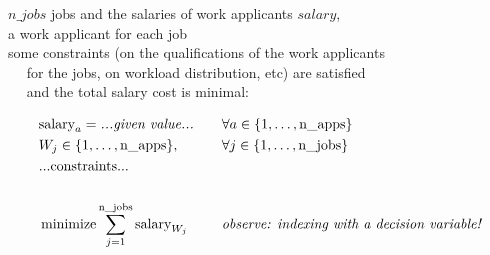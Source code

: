 \documentclass{cons-beamer}
\begin{document}
\begin{frame}
  \begin{example}
     $n\_jobs$ jobs and the salaries of work applicants $salary$, \\ 
     a work applicant for each job \\ 
     some constraints (on the qualifications of the work applicants \\
    ~~ for the jobs, on workload distribution, etc) are satisfied \\ 
    ~~ and the total salary cost is minimal: 

    \small
    \vspace{-1em}
    \begin{align}
      &\text{salary}_a = \textit{...given value...} \quad && \forall a \in \{1, \ldots, \text{n\_apps}\} \\
      &W_j \in \{1, \dots, {\text{n\_apps}}\}, \quad &&\forall j \in \{1, \dots, {\text{n\_jobs}}\} \\
      & \text{...constraints...}&& \\
      & &&\\
      &\operatorname*{minimize} \sum_{j=1}^{{\text{n\_jobs}}} \text{salary}_{W_j} && \textit{observe: indexing with a decision variable!}
    \end{align}
    \vspace{-1em}
  \end{example}
\end{frame}
\end{document}
